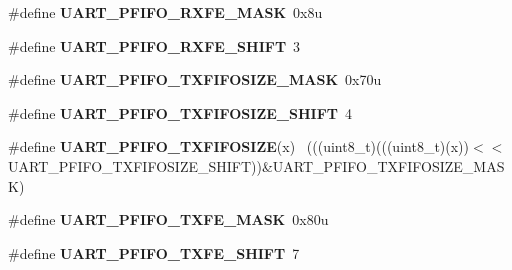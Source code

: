 \begin{DoxyCompactItemize}
\item 
\hypertarget{group___u_a_r_t___register___masks_ga307298b76c15ac932486f994b3afc1b2}{}\#define {\bfseries U\+A\+R\+T\+\_\+\+P\+F\+I\+F\+O\+\_\+\+R\+X\+F\+E\+\_\+\+M\+A\+S\+K}~0x8u\label{group___u_a_r_t___register___masks_ga307298b76c15ac932486f994b3afc1b2}

\item 
\hypertarget{group___u_a_r_t___register___masks_gae2a3c9994dc6da5a2955ac8c274bdaaf}{}\#define {\bfseries U\+A\+R\+T\+\_\+\+P\+F\+I\+F\+O\+\_\+\+R\+X\+F\+E\+\_\+\+S\+H\+I\+F\+T}~3\label{group___u_a_r_t___register___masks_gae2a3c9994dc6da5a2955ac8c274bdaaf}

\item 
\hypertarget{group___u_a_r_t___register___masks_ga61eb610888ac018061d20a755264292a}{}\#define {\bfseries U\+A\+R\+T\+\_\+\+P\+F\+I\+F\+O\+\_\+\+T\+X\+F\+I\+F\+O\+S\+I\+Z\+E\+\_\+\+M\+A\+S\+K}~0x70u\label{group___u_a_r_t___register___masks_ga61eb610888ac018061d20a755264292a}

\item 
\hypertarget{group___u_a_r_t___register___masks_gaa0377f9b585a07f11f887a7d2c8133c8}{}\#define {\bfseries U\+A\+R\+T\+\_\+\+P\+F\+I\+F\+O\+\_\+\+T\+X\+F\+I\+F\+O\+S\+I\+Z\+E\+\_\+\+S\+H\+I\+F\+T}~4\label{group___u_a_r_t___register___masks_gaa0377f9b585a07f11f887a7d2c8133c8}

\item 
\hypertarget{group___u_a_r_t___register___masks_ga944f9fd3754896fe2f66c42c25ffe13d}{}\#define {\bfseries U\+A\+R\+T\+\_\+\+P\+F\+I\+F\+O\+\_\+\+T\+X\+F\+I\+F\+O\+S\+I\+Z\+E}(x)                              ~(((uint8\+\_\+t)(((uint8\+\_\+t)(x))$<$$<$U\+A\+R\+T\+\_\+\+P\+F\+I\+F\+O\+\_\+\+T\+X\+F\+I\+F\+O\+S\+I\+Z\+E\+\_\+\+S\+H\+I\+F\+T))\&U\+A\+R\+T\+\_\+\+P\+F\+I\+F\+O\+\_\+\+T\+X\+F\+I\+F\+O\+S\+I\+Z\+E\+\_\+\+M\+A\+S\+K)\label{group___u_a_r_t___register___masks_ga944f9fd3754896fe2f66c42c25ffe13d}

\item 
\hypertarget{group___u_a_r_t___register___masks_gabd2ffab4f7a98fcfc64dcd37db1b289b}{}\#define {\bfseries U\+A\+R\+T\+\_\+\+P\+F\+I\+F\+O\+\_\+\+T\+X\+F\+E\+\_\+\+M\+A\+S\+K}~0x80u\label{group___u_a_r_t___register___masks_gabd2ffab4f7a98fcfc64dcd37db1b289b}

\item 
\hypertarget{group___u_a_r_t___register___masks_gaf418bafa3c46ece2f82d0c831e8aea47}{}\#define {\bfseries U\+A\+R\+T\+\_\+\+P\+F\+I\+F\+O\+\_\+\+T\+X\+F\+E\+\_\+\+S\+H\+I\+F\+T}~7\label{group___u_a_r_t___register___masks_gaf418bafa3c46ece2f82d0c831e8aea47}


\end{DoxyCompactItemize}
